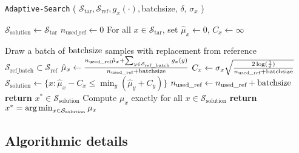 \begin{algorithm}[t]

\caption{
\texttt{Adaptive-Search} (
$\mathcal{S}_{\text{tar}},
\mathcal{S}_{\text{ref}},
g_x(\cdot),
$batchsize,
$\delta$,
$\sigma_x$
) \label{alg:bandit_based_search}}
\begin{algorithmic}[1]
\State $\mathcal{S}_{\text{solution}} \leftarrow \mathcal{S}_{\text{tar}}$ 
\State $n_{\text{used\_ref}} \gets 0$  
\State For all $x \in  \mathcal{S}_{\text{tar}}$, set $\hat{\mu}_x \leftarrow 0$, $C_x \leftarrow \infty$  

        \State Draw a batch of ${\rm batchsize}$ samples with replacement from reference $\mathcal{S}_{\text{ref\_batch}} \subset \mathcal{S}_{\text{ref}}$ 
            \State $\hat{\mu}_x \leftarrow \frac{ n_{\text{used\_ref}} \hat{\mu}_x + \sum_{y \in \mathcal{S}_{\text{ref\_batch}}} g_x(y)}{n_{\text{used\_ref}} + {\rm batchsize} }$ 
            \State $C_x \gets \sigma_x \sqrt{  \frac{ 2 \log(\frac{1}{\delta}) } {n_{\text{used\_ref}} + {\rm batchsize} }}$
        \EndFor
    \State $\mathcal{S}_{\text{solution}} \leftarrow \{x : \hat{\mu}_x - C_x \leq \min_{y}(\hat{\mu}_{y} + C_{y})\}$ 
    \State $n_{\text{used\_ref}} \leftarrow n_{\text{used\_ref}} + {\rm batchsize}$
\EndWhile
{}
    \State \textbf{return} $x^* \in \mathcal{S}_{\text{solution}}$
\Else
    \State Compute $\mu_x$ exactly for all $x \in \mathcal{S}_{\text{solution}}$
    \State \textbf{return} $x^* = \operatorname*{arg\,min}_{x \in \mathcal{S}_{\text{solution}}} \mu_x$
\EndIf
\end{algorithmic}
\end{algorithm}

\subsection{Algorithmic details \label{subsec:algdetails}}
\label{A0}

